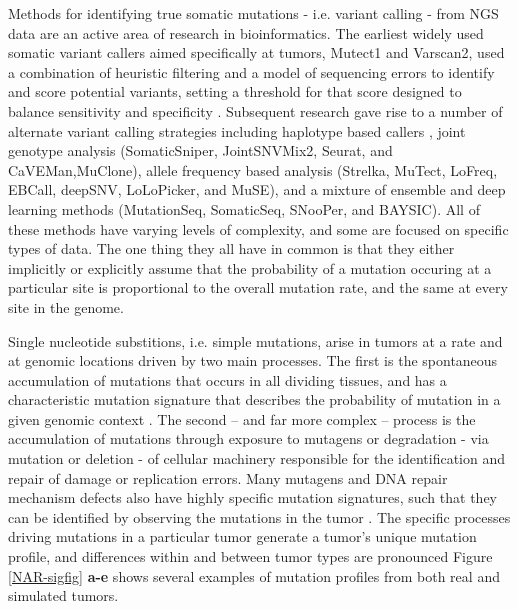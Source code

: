 \documentclass[a4,center,fleqn]{NAR}
\begin{document}
Methods for identifying true somatic mutations - i.e. variant calling -  from NGS data are an active area of research in bioinformatics.
The earliest widely used somatic variant callers aimed specifically at tumors, Mutect1 and Varscan2, used a combination of heuristic filtering and a model of sequencing errors to identify and score potential variants, setting a threshold for that score designed to balance sensitivity and specificity \citep{Koboldt2012,Cibulskis2013}.
Subsequent research gave rise to a number of alternate variant calling strategies including haplotype based callers \citep{Garrison2012},
joint genotype analysis (SomaticSniper, JointSNVMix2, Seurat, and CaVEMan,MuClone)\citep{Larson2012,Roth2012a,Christoforides2013,Jones2016,Dorri2019}, allele frequency based analysis (Strelka, MuTect, LoFreq, EBCall, deepSNV, LoLoPicker, and MuSE)\citep{Saunders2012,Wilm2012,Shiraishi2013b,Gerstung2012,Carrot-Zhang2017,Fan2016}, and a mixture of ensemble and deep learning methods (MutationSeq, SomaticSeq, SNooPer, and BAYSIC).
All of these methods have varying levels of complexity, and some are focused on specific types of data.
The one thing they all have in common is that they either implicitly or explicitly assume that the probability of a mutation occuring at a particular site is proportional to the overall mutation rate, and the same at every site in the genome.

Single nucleotide substitions, i.e. simple mutations, arise in tumors at a rate and at genomic locations driven by two main processes. 
The first is the spontaneous accumulation of mutations that occurs in all dividing tissues, and has a characteristic mutation signature that describes the probability of mutation in a given genomic context \citep{Nik-Zainal2012a,Alexandrov2015,Lee-Six2018}. 
The second -- and far more complex -- process is the accumulation of mutations through exposure to mutagens or degradation - via mutation or deletion - of cellular machinery responsible for the identification and repair of damage or replication errors. 
Many mutagens and DNA repair mechanism defects also have highly specific mutation signatures, such that they can be identified by observing the mutations in the tumor \citep{Alexandrov2013a,Helleday2014a,Nik-Zainal2016,Kandoth2013,Alexandrov2016}.
The specific processes driving mutations in a particular tumor generate a tumor's unique mutation profile, and differences within and between tumor types are pronounced \cite{Stephens2005, Burrell2013a, Nakamura2015, Witkiewicz2015, Kumar2016}
Figure \ref{NAR-sigfig} \textbf{a-e} shows several examples of mutation profiles from both real and simulated tumors.
\end{document}
